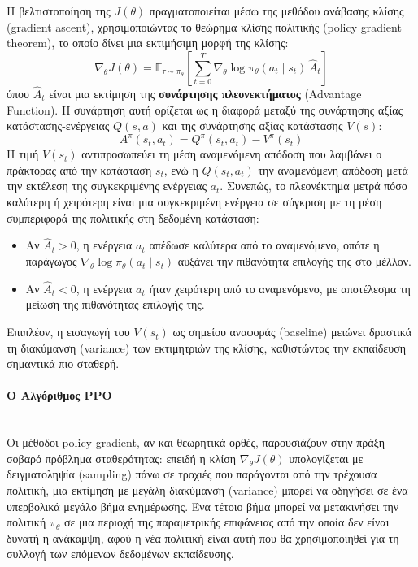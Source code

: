 \documentclass[12pt]{article}
\begin{document}
Η βελτιστοποίηση της $J(\theta)$ πραγματοποιείται μέσω της μεθόδου ανάβασης κλίσης (gradient ascent), χρησιμοποιώντας το θεώρημα κλίσης πολιτικής (policy gradient theorem), το οποίο δίνει μια εκτιμήσιμη μορφή της κλίσης:
\[
\nabla_\theta J(\theta) = \mathbb{E}_{\tau \sim \pi_\theta} \left[ \sum_{t=0}^{T} \nabla_\theta \log \pi_\theta(a_t \mid s_t) \, \hat{A}_t \right]
\]
όπου $\hat{A}_t$ είναι μια εκτίμηση της \textbf{συνάρτησης πλεονεκτήματος} (Advantage Function). Η συνάρτηση αυτή ορίζεται ως η διαφορά μεταξύ της συνάρτησης αξίας κατάστασης-ενέργειας $Q(s, a)$ και της συνάρτησης αξίας κατάστασης $V(s)$:
\[
A^{\pi}(s_t, a_t) = Q^{\pi}(s_t, a_t) - V^{\pi}(s_t)
\]
Η τιμή $V(s_t)$ αντιπροσωπεύει τη μέση αναμενόμενη απόδοση που λαμβάνει ο πράκτορας από την κατάσταση $s_t$, ενώ η $Q(s_t, a_t)$ την αναμενόμενη απόδοση μετά την εκτέλεση της συγκεκριμένης ενέργειας $a_t$. Συνεπώς, το πλεονέκτημα μετρά πόσο καλύτερη ή χειρότερη είναι μια συγκεκριμένη ενέργεια σε σύγκριση με τη μέση συμπεριφορά της πολιτικής στη δεδομένη κατάσταση:
\begin{itemize}
	\item Αν $\hat{A}_t > 0$, η ενέργεια $a_t$ απέδωσε καλύτερα από το αναμενόμενο, οπότε η παράγωγος $\nabla_\theta \log \pi_\theta(a_t \mid s_t)$ αυξάνει την πιθανότητα επιλογής της στο μέλλον.
	\item Αν $\hat{A}_t < 0$, η ενέργεια $a_t$ ήταν χειρότερη από το αναμενόμενο, με αποτέλεσμα τη μείωση της πιθανότητας επιλογής της.
\end{itemize}
Επιπλέον, η εισαγωγή του $V(s_t)$ ως σημείου αναφοράς (baseline) μειώνει δραστικά τη διακύμανση (variance) των εκτιμητριών της κλίσης, καθιστώντας την εκπαίδευση σημαντικά πιο σταθερή.

\paragraph{Ο Αλγόριθμος PPO}~\\
Οι μέθοδοι policy gradient, αν και θεωρητικά ορθές, παρουσιάζουν στην πράξη σοβαρό πρόβλημα σταθερότητας: επειδή η κλίση $\nabla_\theta J(\theta)$ υπολογίζεται με δειγματοληψία (sampling) πάνω σε τροχιές που παράγονται από την τρέχουσα πολιτική, μια εκτίμηση με μεγάλη διακύμανση (variance) μπορεί να οδηγήσει σε ένα υπερβολικά μεγάλο βήμα ενημέρωσης. Ένα τέτοιο βήμα μπορεί να μετακινήσει την πολιτική $\pi_\theta$ σε μια περιοχή της παραμετρικής επιφάνειας από την οποία δεν είναι δυνατή η ανάκαμψη, αφού η νέα πολιτική είναι αυτή που θα χρησιμοποιηθεί για τη συλλογή των επόμενων δεδομένων εκπαίδευσης. 
\end{document}
